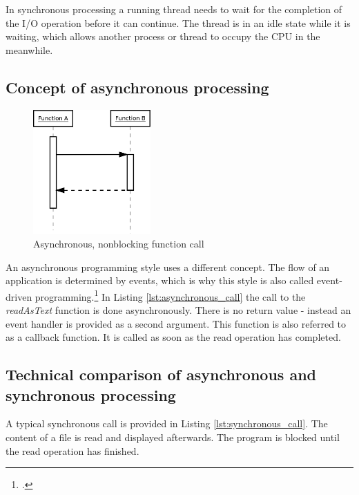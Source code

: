 In synchronous processing a running thread needs to wait for the completion of
the I/O operation before it can continue.
The thread is in an idle state while it is waiting, which allows another process 
or thread to occupy the CPU in the meanwhile.
\FloatBarrier
\subsection{Concept of asynchronous processing}
\label{concept_async}
\FloatBarrier

\begin{figure}[hbtp]
\centering
\includegraphics[width=0.4\textwidth]{img/asynch_call.png}
\caption{Asynchronous, nonblocking function call}
\label{fig:asynch_call}
\end{figure}

An asynchronous programming style uses a different concept. The flow of an
application is determined by events, which is why this style is also called
event-driven programming.\footcite[Cf.][16]{teixeira_2012} In Listing \ref{lst:asynchronous_call} the call
to the \textit{readAsText} function is done asynchronously. There is no
return value - instead an event handler is provided as a second argument.
This function is also referred to as a callback function. It is called
as soon as the read operation has completed.

\FloatBarrier

\subsection{Technical comparison of asynchronous and synchronous processing}
\label{comparison_syncasync}


A typical synchronous call is provided in Listing \ref{lst:synchronous_call}. The
content of a file is read and displayed afterwards. The program is blocked until the
read operation has finished.

